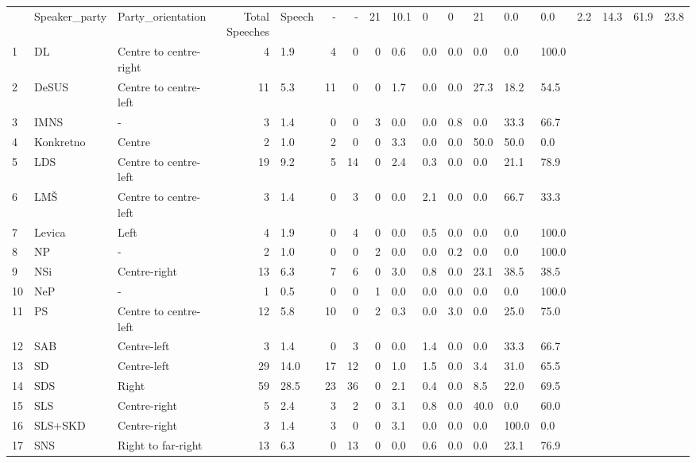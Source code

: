 \begin{tabular}{lllrlrrrllllll}
\toprule
 & Speaker_party & Party_orientation & Total Speeches & Speech %
 & - & - & 21 & 10.1 & 0 & 0 & 21 & 0.0 & 0.0 & 2.2 & 14.3 & 61.9 & 23.8 \\
1 & DL & Centre to centre-right & 4 & 1.9 & 4 & 0 & 0 & 0.6 & 0.0 & 0.0 & 0.0 & 0.0 & 100.0 \\
2 & DeSUS & Centre to centre-left & 11 & 5.3 & 11 & 0 & 0 & 1.7 & 0.0 & 0.0 & 27.3 & 18.2 & 54.5 \\
3 & IMNS & - & 3 & 1.4 & 0 & 0 & 3 & 0.0 & 0.0 & 0.8 & 0.0 & 33.3 & 66.7 \\
4 & Konkretno & Centre & 2 & 1.0 & 2 & 0 & 0 & 3.3 & 0.0 & 0.0 & 50.0 & 50.0 & 0.0 \\
5 & LDS & Centre to centre-left & 19 & 9.2 & 5 & 14 & 0 & 2.4 & 0.3 & 0.0 & 0.0 & 21.1 & 78.9 \\
6 & LMŠ & Centre to centre-left & 3 & 1.4 & 0 & 3 & 0 & 0.0 & 2.1 & 0.0 & 0.0 & 66.7 & 33.3 \\
7 & Levica & Left & 4 & 1.9 & 0 & 4 & 0 & 0.0 & 0.5 & 0.0 & 0.0 & 0.0 & 100.0 \\
8 & NP & - & 2 & 1.0 & 0 & 0 & 2 & 0.0 & 0.0 & 0.2 & 0.0 & 0.0 & 100.0 \\
9 & NSi & Centre-right & 13 & 6.3 & 7 & 6 & 0 & 3.0 & 0.8 & 0.0 & 23.1 & 38.5 & 38.5 \\
10 & NeP & - & 1 & 0.5 & 0 & 0 & 1 & 0.0 & 0.0 & 0.0 & 0.0 & 0.0 & 100.0 \\
11 & PS & Centre to centre-left & 12 & 5.8 & 10 & 0 & 2 & 0.3 & 0.0 & 3.0 & 0.0 & 25.0 & 75.0 \\
12 & SAB & Centre-left & 3 & 1.4 & 0 & 3 & 0 & 0.0 & 1.4 & 0.0 & 0.0 & 33.3 & 66.7 \\
13 & SD & Centre-left & 29 & 14.0 & 17 & 12 & 0 & 1.0 & 1.5 & 0.0 & 3.4 & 31.0 & 65.5 \\
14 & SDS & Right & 59 & 28.5 & 23 & 36 & 0 & 2.1 & 0.4 & 0.0 & 8.5 & 22.0 & 69.5 \\
15 & SLS & Centre-right & 5 & 2.4 & 3 & 2 & 0 & 3.1 & 0.8 & 0.0 & 40.0 & 0.0 & 60.0 \\
16 & SLS+SKD & Centre-right & 3 & 1.4 & 3 & 0 & 0 & 3.1 & 0.0 & 0.0 & 0.0 & 100.0 & 0.0 \\
17 & SNS & Right to far-right & 13 & 6.3 & 0 & 13 & 0 & 0.0 & 0.6 & 0.0 & 0.0 & 23.1 & 76.9 \\
\bottomrule
\end{tabular}
